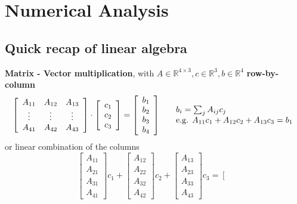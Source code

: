 \documentclass[10pt]{report}
\begin{document}
\chapter{Numerical Analysis}
\section{Quick recap of linear algebra}
\begin{list}{}{}
	\item \textbf{Matrix - Vector multiplication}, with $A\in \mathbb{R}^{4\times 3}, c\in \mathbb{R}^3, b\in \mathbb{R}^4$ \textbf{row-by-column}
	$$\left[\begin{array}{c c c}
		A_{11} & A_{12} & A_{13}\\
		\vdots & \vdots & \vdots\\
		A_{41} & A_{42} & A_{43}
	\end{array}\right]\cdot \left[\begin{array}{c}
		c_1\\c_2\\c_3
	\end{array}\right] = \left[\begin{array}{c}
		b_1\\b_2\\b_3\\b_4
	\end{array}\right]\:\:\:\:\:\:\begin{array}{l}
		b_i = \sum_{j} A_{ij}c_j\\
		\text{e.g. }A_{11}c_1 + A_{12}c_2 + A_{13}c_3 = b_1
	\end{array}$$
	or linear combination of the columns
	$$\left[\begin{array}{c}
	A_{11}\\A_{21}\\A_{31}\\A_{41}
	\end{array}\right]c_1 + \left[\begin{array}{c}
	A_{12}\\A_{22}\\A_{32}\\A_{42}
	\end{array}\right]c_2 + \left[\begin{array}{c}
	A_{13}\\A_{23}\\A_{33}\\A_{43}
	\end{array}\right]c_3 = \left[\begin{array}{c}

\end{array}$$
\end{list}
\end{document}
